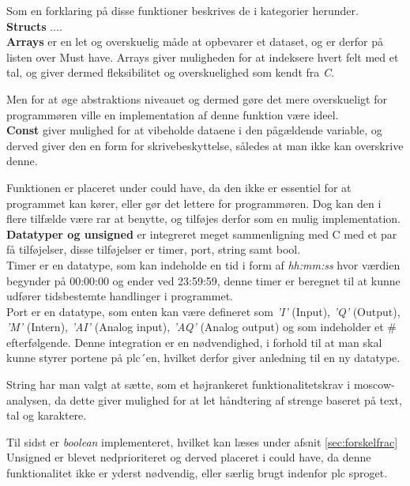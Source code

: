 Som en forklaring på disse funktioner beskrives de i kategorier herunder.\\

\noindent\textbf{Structs}
....
\\


\noindent\textbf{Arrays}
er en let og overskuelig måde at opbevarer et dataset, og er derfor på listen over Must have. Arrays giver muligheden for at indeksere hvert felt med et tal, og giver dermed fleksibilitet og overskuelighed som kendt fra \textit{C}.

Men for at øge abstraktions niveauet og dermed gøre det mere overskueligt for programmøren ville en implementation af denne funktion være ideel.\\

\noindent\textbf{Const}
giver mulighed for at vibeholde dataene i den pågældende variable, og derved giver den en form for skrivebeskyttelse, således at man ikke kan overskrive denne.

Funktionen er placeret under could have, da den ikke er essentiel for at programmet kan kører, eller gør det lettere for programmøren. 
Dog kan den i flere tilfælde være rar at benytte, og tilføjes derfor som en mulig implementation.\\

\noindent\textbf{Datatyper og unsigned}
er integreret meget sammenligning med C med et par få tilføjelser, disse tilføjelser er timer, port, string samt bool.\\
Timer er en datatype, som kan indeholde en tid i form af \textit{hh:mm:ss} hvor værdien begynder på 00:00:00 og ender ved 23:59:59, denne timer er beregnet til at kunne udfører tidsbestemte handlinger i programmet.\\
Port er en datatype, som enten kan være defineret som \textit{'I'} (Input), \textit{'Q'} (Output), \textit{'M'} (Intern), \textit{'AI'} (Analog input), \textit{'AQ'} (Analog output) og som indeholder et \# efterfølgende. Denne integration er en nødvendighed, i forhold til at man skal kunne styrer portene på \gls{plc}´en, hvilket derfor giver anledning til en ny datatype.

String har man valgt at sætte, som et højrankeret funktionalitetskrav i \gls{moscow}-analysen, da dette giver mulighed for at let håndtering af strenge baseret på text, tal og karaktere. 

Til sidst er \textit{boolean} implementeret, hvilket kan læses under afsnit \ref{sec:forskelfrac}\\
Unsigned er blevet nedprioriteret og derved placeret i could have, da denne funktionalitet ikke er yderst nødvendig, eller særlig brugt indenfor \gls{plc} sproget.\\

